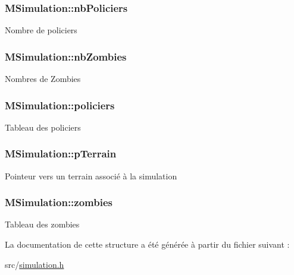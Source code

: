 \subsubsection[{\texorpdfstring{nb\+Policiers}{nbPoliciers}}]{\setlength{\rightskip}{0pt plus 5cm}M\+Simulation\+::nb\+Policiers}\hypertarget{structMSimulation_a36feaca3afcb2dca6023254639ce545c}{}\label{structMSimulation_a36feaca3afcb2dca6023254639ce545c}
Nombre de policiers 
\subsubsection[{\texorpdfstring{nb\+Zombies}{nbZombies}}]{\setlength{\rightskip}{0pt plus 5cm}M\+Simulation\+::nb\+Zombies}\hypertarget{structMSimulation_a2be6307fb9eeb91c0292e363e61e0c1a}{}\label{structMSimulation_a2be6307fb9eeb91c0292e363e61e0c1a}
Nombres de Zombies 
\subsubsection[{\texorpdfstring{policiers}{policiers}}]{\setlength{\rightskip}{0pt plus 5cm}M\+Simulation\+::policiers}\hypertarget{structMSimulation_a8281fb3df339f2006ce172e9de7d6910}{}\label{structMSimulation_a8281fb3df339f2006ce172e9de7d6910}
Tableau des policiers 
\subsubsection[{\texorpdfstring{p\+Terrain}{pTerrain}}]{\setlength{\rightskip}{0pt plus 5cm}M\+Simulation\+::p\+Terrain}\hypertarget{structMSimulation_aefc18c24eb2ab2f1224ff2063114122b}{}\label{structMSimulation_aefc18c24eb2ab2f1224ff2063114122b}
Pointeur vers un terrain associé à la simulation 
\subsubsection[{\texorpdfstring{zombies}{zombies}}]{\setlength{\rightskip}{0pt plus 5cm}M\+Simulation\+::zombies}\hypertarget{structMSimulation_ab18a020f5a29032678796540fdb981cc}{}\label{structMSimulation_ab18a020f5a29032678796540fdb981cc}
Tableau des zombies 

La documentation de cette structure a été générée à partir du fichier suivant \+:\begin{DoxyCompactItemize}
\item 
src/\hyperlink{simulation_8h}{simulation.\+h}\end{DoxyCompactItemize}
